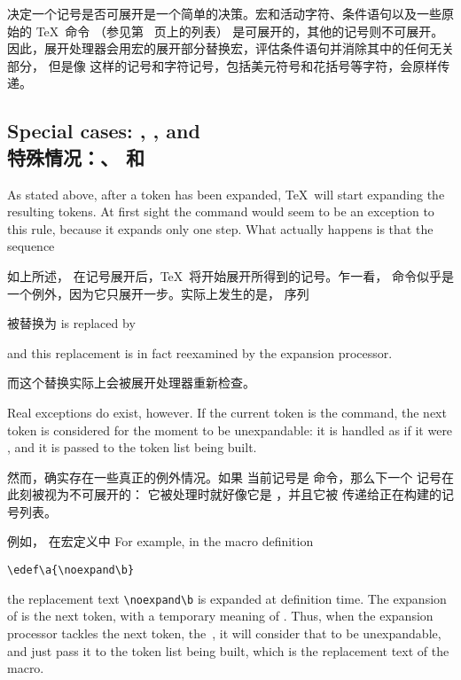 决定一个记号是否可展开是一个简单的决策。宏和活动字符、条件语句以及一些原始的 \TeX\ 命令
\awp
（参见第~\pageref{expand:lijst} 页上的列表）
是可展开的，其他的记号则不可展开。
因此，展开处理器会用宏的展开部分替换宏，评估条件语句并消除其中的任何无关部分，
但是像  这样的记号和字符记号，包括美元符号和花括号等字符，会原样传递。



\subsection{Special cases: , , and \\特殊情况：、 和 }

As stated above,
after a token has been expanded, \TeX\ will start expanding
the resulting tokens. At first sight the 
command would seem to be an exception to this rule, because
it expands only one step. What actually happens is that
the sequence 

如上所述，
在记号展开后，\TeX\ 将开始展开所得到的记号。乍一看，
命令似乎是一个例外，因为它只展开一步。实际上发生的是，
序列\begin{disp}\end{disp}
被替换为 \hfill is replaced by 
\begin{disp}\end{disp}
and this replacement is in fact reexamined by the expansion
processor.

而这个替换实际上会被展开处理器重新检查。

Real exceptions do exist, however. If the 
current token is the  command, the next
token is considered for the moment to be unexpandable:
it is handled as if it were , and it is
passed to the token list being built.

然而，确实存在一些真正的例外情况。如果
当前记号是  命令，那么下一个
记号在此刻被视为不可展开的：
它被处理时就好像它是 ，并且它被
传递给正在构建的记号列表。


例如，
在宏定义中\hfill
For example,
in the macro definition
\begin{verbatim}
\edef\a{\noexpand\b}
\end{verbatim}
the replacement text \verb>\noexpand\b> is expanded at definition 
time. The expansion of  is the next token, with
a temporary meaning of . Thus, when the expansion
processor tackles the next token, the~, it will consider
that to be unexpandable, and just pass it to the token list
being built, which is the replacement text of the macro.

